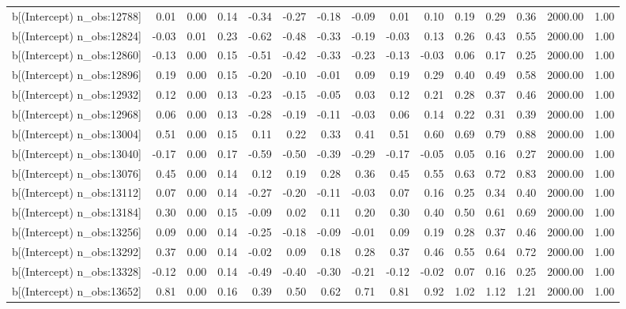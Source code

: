 \begin{table}[ht]
\begin{tabular}{rrrrrrrrrrrrrrr}
  b[(Intercept) n\_obs:12788] & 0.01 & 0.00 & 0.14 & -0.34 & -0.27 & -0.18 & -0.09 & 0.01 & 0.10 & 0.19 & 0.29 & 0.36 & 2000.00 & 1.00 \\ 
  b[(Intercept) n\_obs:12824] & -0.03 & 0.01 & 0.23 & -0.62 & -0.48 & -0.33 & -0.19 & -0.03 & 0.13 & 0.26 & 0.43 & 0.55 & 2000.00 & 1.00 \\ 
  b[(Intercept) n\_obs:12860] & -0.13 & 0.00 & 0.15 & -0.51 & -0.42 & -0.33 & -0.23 & -0.13 & -0.03 & 0.06 & 0.17 & 0.25 & 2000.00 & 1.00 \\ 
  b[(Intercept) n\_obs:12896] & 0.19 & 0.00 & 0.15 & -0.20 & -0.10 & -0.01 & 0.09 & 0.19 & 0.29 & 0.40 & 0.49 & 0.58 & 2000.00 & 1.00 \\ 
  b[(Intercept) n\_obs:12932] & 0.12 & 0.00 & 0.13 & -0.23 & -0.15 & -0.05 & 0.03 & 0.12 & 0.21 & 0.28 & 0.37 & 0.46 & 2000.00 & 1.00 \\ 
  b[(Intercept) n\_obs:12968] & 0.06 & 0.00 & 0.13 & -0.28 & -0.19 & -0.11 & -0.03 & 0.06 & 0.14 & 0.22 & 0.31 & 0.39 & 2000.00 & 1.00 \\ 
  b[(Intercept) n\_obs:13004] & 0.51 & 0.00 & 0.15 & 0.11 & 0.22 & 0.33 & 0.41 & 0.51 & 0.60 & 0.69 & 0.79 & 0.88 & 2000.00 & 1.00 \\ 
  b[(Intercept) n\_obs:13040] & -0.17 & 0.00 & 0.17 & -0.59 & -0.50 & -0.39 & -0.29 & -0.17 & -0.05 & 0.05 & 0.16 & 0.27 & 2000.00 & 1.00 \\ 
  b[(Intercept) n\_obs:13076] & 0.45 & 0.00 & 0.14 & 0.12 & 0.19 & 0.28 & 0.36 & 0.45 & 0.55 & 0.63 & 0.72 & 0.83 & 2000.00 & 1.00 \\ 
  b[(Intercept) n\_obs:13112] & 0.07 & 0.00 & 0.14 & -0.27 & -0.20 & -0.11 & -0.03 & 0.07 & 0.16 & 0.25 & 0.34 & 0.40 & 2000.00 & 1.00 \\ 
  b[(Intercept) n\_obs:13184] & 0.30 & 0.00 & 0.15 & -0.09 & 0.02 & 0.11 & 0.20 & 0.30 & 0.40 & 0.50 & 0.61 & 0.69 & 2000.00 & 1.00 \\ 
  b[(Intercept) n\_obs:13256] & 0.09 & 0.00 & 0.14 & -0.25 & -0.18 & -0.09 & -0.01 & 0.09 & 0.19 & 0.28 & 0.37 & 0.46 & 2000.00 & 1.00 \\ 
  b[(Intercept) n\_obs:13292] & 0.37 & 0.00 & 0.14 & -0.02 & 0.09 & 0.18 & 0.28 & 0.37 & 0.46 & 0.55 & 0.64 & 0.72 & 2000.00 & 1.00 \\ 
  b[(Intercept) n\_obs:13328] & -0.12 & 0.00 & 0.14 & -0.49 & -0.40 & -0.30 & -0.21 & -0.12 & -0.02 & 0.07 & 0.16 & 0.25 & 2000.00 & 1.00 \\ 
  b[(Intercept) n\_obs:13652] & 0.81 & 0.00 & 0.16 & 0.39 & 0.50 & 0.62 & 0.71 & 0.81 & 0.92 & 1.02 & 1.12 & 1.21 & 2000.00 & 1.00 \\ 

\end{tabular}
\end{table}
